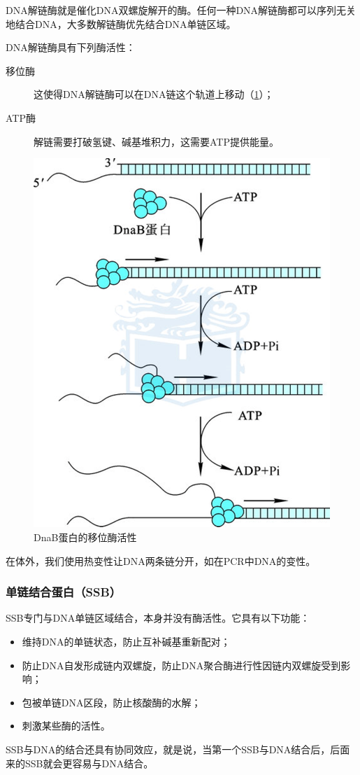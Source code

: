 DNA解链酶就是催化DNA双螺旋解开的酶。任何一种DNA解链酶都可以序列无关地结合DNA，大多数解链酶优先结合DNA单链区域。

DNA解链酶具有下列酶活性：
\begin{description}
	\item[移位酶] 这使得DNA解链酶可以在DNA链这个轨道上移动（\ref{fig:Dnab}）；
	\item[ATP酶] 解链需要打破氢键、碱基堆积力，这需要ATP提供能量。
\end{description}

\begin{figure}
	\centering
	\includegraphics[width=0.5\linewidth]{Pics/DnaB}
	\caption{DnaB蛋白的移位酶活性}
	\label{fig:Dnab}
\end{figure}


在体外，我们使用热变性让DNA两条链分开，如在PCR中DNA的变性。

\subsubsection{单链结合蛋白（SSB）}

SSB专门与DNA单链区域结合，本身并没有酶活性。它具有以下功能：\begin{itemize}
	\item 维持DNA的单链状态，防止互补碱基重新配对；
	\item 防止DNA自发形成链内双螺旋，防止DNA聚合酶进行性因链内双螺旋受到影响；
	\item 包被单链DNA区段，防止核酸酶的水解；
	\item 刺激某些酶的活性。
\end{itemize}

SSB与DNA的结合还具有协同效应，就是说，当第一个SSB与DNA结合后，后面来的SSB就会更容易与DNA结合。

